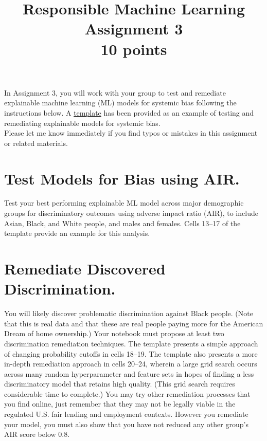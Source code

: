 \documentclass[fleqn]{article}
\title{Responsible Machine Learning\\\Large{Assignment 3}\\\Large{10 points}}
\begin{document}
\maketitle

\noindent In Assignment 3, you will work with your group to test and remediate explainable machine learning (ML) models for systemic bias following the instructions below. A \href{https://nbviewer.jupyter.org/github/jphall663/GWU_rml/blob/master/assignments/assignment_3/assign_3_template.ipynb?flush_cache=true}{template} has been provided as an example of testing and remediating explainable models for systemic bias. \\

\noindent Please let me know immediately if you find typos or mistakes in this assignment or related materials. 

\section{Test Models for Bias using AIR.}

Test your best performing explainable ML model across major demographic groups for discriminatory outcomes using adverse impact ratio (AIR), to include Asian, Black, and White people, and males and females. Cells 13--17 of the template provide an example for this analysis. 

\section{Remediate Discovered Discrimination.}

You will likely discover problematic discrimination against Black people. (Note that this is real data and that these are real people paying more for the American Dream of home ownership.) Your notebook must propose at least two discrimination remediation techniques. The template presents a simple approach of changing probability cutoffs in cells 18--19. The template also presents a more in-depth remediation approach in cells 20--24, wherein a large grid search occurs across many random hyperparameter and feature sets in hopes of finding a less discriminatory model that retains high quality. (This grid search requires considerable time to complete.) You may try other remediation processes that you find online, just remember that they may not be legally viable in the regulated U.S. fair lending and employment contexts. However you remediate your model, you must also show that you have not reduced any other group's AIR score below 0.8. 
\end{document}
